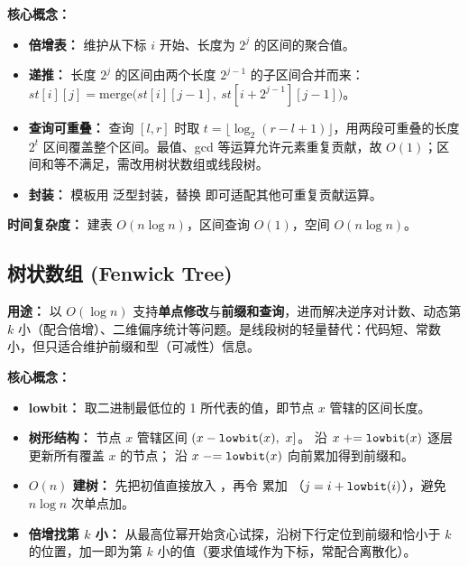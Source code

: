 \textbf{核心概念：}
\begin{itemize}
  \item \textbf{倍增表：}  维护从下标 $i$ 开始、长度为 $2^j$ 的区间的聚合值。
  \item \textbf{递推：} 长度 $2^j$ 的区间由两个长度 $2^{j-1}$ 的子区间合并而来：$st[i][j] = \mathrm{merge}\big(st[i][j-1],\ st[i + 2^{j-1}][j-1]\big)$。
  \item \textbf{查询可重叠：} 查询 $[l, r]$ 时取 $t = \lfloor \log_2 (r - l + 1) \rfloor$，用两段可重叠的长度 $2^t$ 区间覆盖整个区间。最值、gcd 等运算允许元素重复贡献，故 $O(1)$；区间和等不满足，需改用树状数组或线段树。
  \item \textbf{封装：} 模板用  泛型封装，替换  即可适配其他可重复贡献运算。
\end{itemize}

\textbf{时间复杂度：} 建表 $O(n \log n)$，区间查询 $O(1)$，空间 $O(n \log n)$。



\subsection{树状数组 (Fenwick Tree)}

\textbf{用途：}
以 $O(\log n)$ 支持\textbf{单点修改}与\textbf{前缀和查询}，进而解决逆序对计数、动态第 $k$ 小（配合倍增）、二维偏序统计等问题。是线段树的轻量替代：代码短、常数小，但只适合维护前缀和型（可减性）信息。

\textbf{核心概念：}
\begin{itemize}
  \item \textbf{lowbit：}  取二进制最低位的 1 所代表的值，即节点 $x$ 管辖的区间长度。
  \item \textbf{树形结构：} 节点 $x$ 管辖区间 $(x - \texttt{lowbit}(x),\ x]$。 沿 $x \mathrel{+}= \texttt{lowbit}(x)$ 逐层更新所有覆盖 $x$ 的节点； 沿 $x \mathrel{-}= \texttt{lowbit}(x)$ 向前累加得到前缀和。
  \item \textbf{$O(n)$ 建树：} 先把初值直接放入 ，再令  累加 （$j = i + \texttt{lowbit}(i)$），避免 $n \log n$ 次单点加。
  \item \textbf{倍增找第 $k$ 小：} 从最高位幂开始贪心试探，沿树下行定位到前缀和恰小于 $k$ 的位置，加一即为第 $k$ 小的值（要求值域作为下标，常配合离散化）。
\end{itemize}

